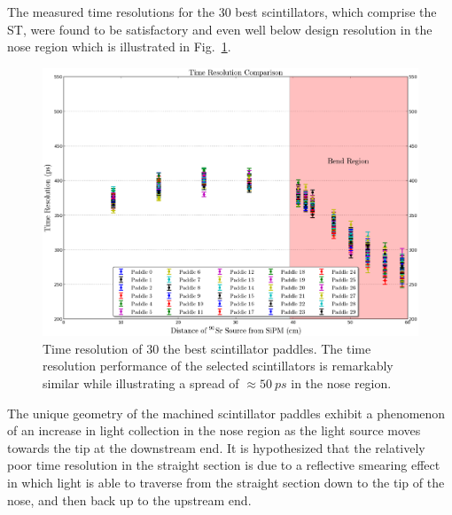 The measured time resolutions for the 30 best scintillators, which comprise the ST, were found to be satisfactory and even well below design resolution in the nose region which is illustrated in Fig.~\ref{fig:time_res_comp_final_30}.
	\begin{figure}[!htb]
		\centering
		\includegraphics[width=1.0\columnwidth]{fabrication/figs/time_res_comp_final_30}
		\caption{Time resolution of 30 the best scintillator paddles.  The time resolution performance of the selected scintillators is remarkably similar while illustrating a spread of $\approx 50\ ps$ in the nose region.}
		\label{fig:time_res_comp_final_30}
	\end{figure}

The unique geometry of the machined scintillator paddles exhibit a phenomenon of an increase in light collection in the nose region as the light source moves towards the tip at the downstream end.  It is hypothesized that the relatively poor time resolution in the straight section is due to a reflective smearing effect in which light is able to traverse from the straight section down to the tip of the nose, and then back up to the upstream end.

